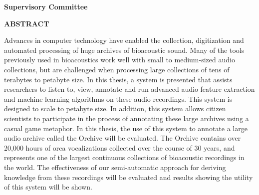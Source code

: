\newpage
{}

\noindent \textbf{Supervisory Committee}
\tpbreak
\panel

\begin{center}
\textbf{ABSTRACT}
\end{center}

Advances in computer technology have enabled the collection,
digitization and automated processing of huge archives of bioacoustic
sound.  Many of the tools previously used in bioacoustics work well
with small to medium-sized audio collections, but are challenged when
processing large collections of tens of terabytes to petabyte size.
In this thesis, a system is presented that assists researchers to
listen to, view, annotate and run advanced audio feature extraction
and machine learning algorithms on these audio recordings.  This
system is designed to scale to petabyte size.  In addition, this
system allows citizen scientists to participate in the process of
annotating these large archives using a casual game metaphor.  In this
thesis, the use of this system to annotate a large audio archive
called the Orchive will be evaluated.  The Orchive contains over
20,000 hours of orca vocalizations collected over the course of 30
years, and represents one of the largest continuous collections of
bioacoustic recordings in the world.  The effectiveness of our
semi-automatic approach for deriving knowledge from these recordings
will be evaluated and results showing the utility of this system will
be shown.
